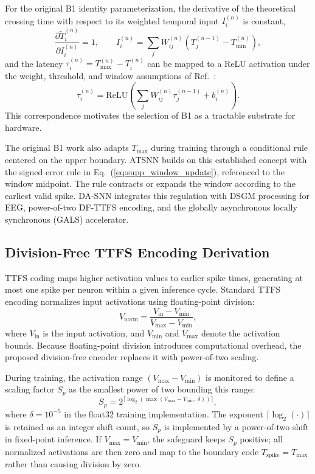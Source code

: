 \documentclass[12pt]{article}
\begin{document}
For the original B1 identity parameterization, the derivative of the theoretical crossing time with respect to its weighted temporal input $I_i^{(n)}$ is constant,
\begin{equation}
\frac{\partial \tilde{T}_i^{(n)}}{\partial I_i^{(n)}}=1,
\qquad
I_i^{(n)}=\sum_j W_{ij}^{(n)}\!\left(T_j^{(n-1)}-T_{\min}^{(n)}\right),
\label{eq:b1_slope}
\end{equation}
and the latency $\tau_i^{(n)}=T_{\max}^{(n)}-T_i^{(n)}$ can be mapped to a ReLU activation under the weight, threshold, and window assumptions of Ref.~\cite{ref46}:
\begin{equation}
\tau_i^{(n)}=\mathrm{ReLU}\!\left(\sum_j W_{ij}^{(n)}\tau_j^{(n-1)}+b_i^{(n)}\right).
\label{eq:b1_relu}
\end{equation}
This correspondence motivates the selection of B1 as a tractable substrate for hardware.

The original B1 work also adapts $T_{\max}$ during training through a conditional rule centered on the upper boundary. ATSNN builds on this established concept with the signed error rule in Eq.~(\ref{eq:supp_window_update}), referenced to the window midpoint. The rule contracts or expands the window according to the earliest valid spike. DA-SNN integrates this regulation with DSGM processing for EEG, power-of-two DF-TTFS encoding, and the globally asynchronous locally synchronous (GALS) accelerator.

\subsection{Division-Free TTFS Encoding Derivation}

TTFS coding maps higher activation values to earlier spike times, generating at most one spike per neuron within a given inference cycle. Standard TTFS encoding normalizes input activations using floating-point division:
 \begin{equation}
V_{\mathrm{norm}} = \frac{V_{\mathrm{in}}-V_{\min}}{V_{\max}-V_{\min}},
\end{equation}
where $V_{\mathrm{in}}$ is the input activation, and $V_{\min}$ and $V_{\max}$ denote the activation bounds. Because floating-point division introduces computational overhead, the proposed division-free encoder replaces it with power-of-two scaling. 

During training, the activation range $(V_{\max}-V_{\min})$ is monitored to define a scaling factor $S_p$ as the smallest power of two bounding this range:
 \begin{equation}
S_p = 2^{\lceil \log_2(\max(V_{\max}-V_{\min},\,\delta)) \rceil},
\end{equation}
where $\delta=10^{-5}$ in the float32 training implementation. The exponent $\lceil\log_2(\cdot)\rceil$ is retained as an integer shift count, so $S_p$ is implemented by a power-of-two shift in fixed-point inference. If $V_{\max}=V_{\min}$, the safeguard keeps $S_p$ positive; all normalized activations are then zero and map to the boundary code $T_{\mathrm{spike}}=T_{\max}$ rather than causing division by zero.
\end{document}
